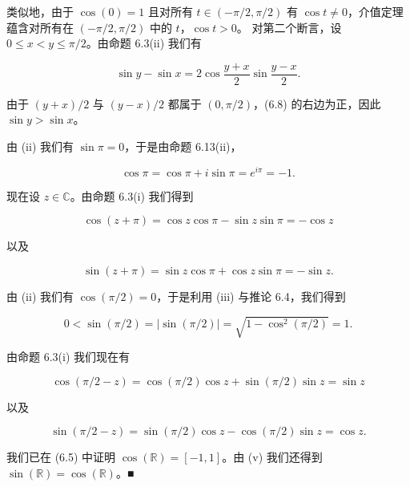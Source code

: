 \begin{theorem}
\begin{subitems}
类似地，由于 $ \cos(0)=1 $ 且对所有 $ t\in(-\pi/2,\pi/2) $ 有 $ \cos t\neq0 $，介值定理蕴含对所有在 $ (-\pi/2,\pi/2) $ 中的 $ t $，$ \cos t>0 $。
对第二个断言，设 $ 0 \leq x < y \leq \pi/2 $。由命题 6.3(ii) 我们有

\begin{equation}
\sin y-\sin x=2\cos\frac{y+x}{2}\sin\frac{y-x}{2}.
\end{equation}

由于 $(y+x)/2$ 与 $(y-x)/2$ 都属于 $(0,\pi/2)$，(6.8) 的右边为正，因此 $\sin y > \sin x$。

\item[（iv）]

由 (ii) 我们有 $ \sin\pi=0 $，于是由命题 6.13(ii)，

\[
\cos\pi=\cos\pi+i\sin\pi=e^{i\pi}=-1.
\]

现在设 $ z \in \mathbb{C} $。由命题 6.3(i) 我们得到

\[
\cos(z+\pi)=\cos z\cos\pi-\sin z\sin\pi=-\cos z
\]

以及

\[
\sin(z+\pi)=\sin z\cos\pi+\cos z\sin\pi=-\sin z.
\]
\item[（v）]

由 (ii) 我们有 $ \cos(\pi/2)=0 $，于是利用 (iii) 与推论 6.4，我们得到

\[
0<\sin(\pi/2)=\left|\sin(\pi/2)\right|=\sqrt{1-\cos^{2}(\pi/2)}=1.
\]

由命题 6.3(i) 我们现在有

\[
\cos(\pi/2-z)=\cos(\pi/2)\cos z+\sin(\pi/2)\sin z=\sin z
\]

以及

\[
\sin(\pi/2-z)=\sin(\pi/2)\cos z-\cos(\pi/2)\sin z=\cos z.
\]
\item[（vi）]

我们已在 (6.5) 中证明 $ \cos(\mathbb{R}) = [-1, 1] $。由 (v) 我们还得到 $ \sin(\mathbb{R}) = \cos(\mathbb{R}) $。■

\end{subitems}

\end{theorem}

